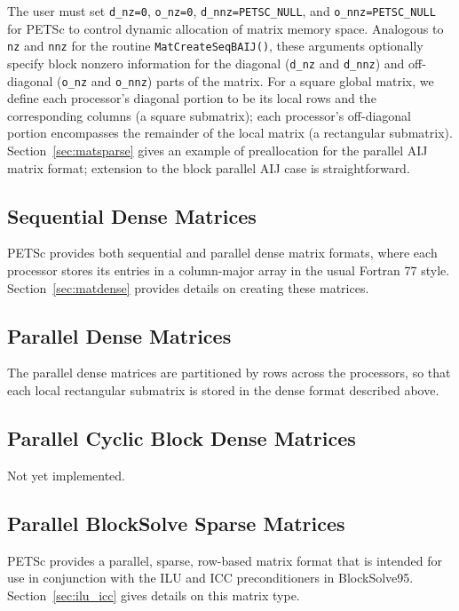 The user must set {\tt d\_nz=0}, {\tt o\_nz=0}, {\tt d\_nnz=PETSC\_NULL}, and 
{\tt o\_nnz=PETSC\_NULL} for PETSc to control dynamic allocation of matrix
memory space.  Analogous to {\tt nz} and {\tt nnz} for the routine 
{\tt MatCreateSeqBAIJ()}, these arguments optionally specify 
block nonzero information for the diagonal ({\tt d\_nz} and {\tt d\_nnz}) and 
off-diagonal ({\tt o\_nz} and {\tt o\_nnz}) parts of the matrix. 
For a square global matrix, we define each processor's diagonal portion 
to be its local rows and the corresponding columns (a square submatrix);  
each processor's off-diagonal portion encompasses the remainder of the
local matrix (a rectangular submatrix).  
Section~\ref{sec:matsparse} gives an example of preallocation for
the parallel AIJ matrix format; extension to the block parallel AIJ case
is straightforward.

\subsection{Sequential Dense Matrices}

PETSc provides both sequential and parallel dense matrix formats,
where each processor stores its entries in a column-major array in the
usual Fortran 77 style.  Section~\ref{sec:matdense} provides details
on creating these matrices.

\subsection{Parallel Dense Matrices}

The parallel dense matrices are partitioned by rows across the
processors, so that each local rectangular submatrix is stored in the
dense format described above.

\subsection{Parallel Cyclic Block Dense Matrices}
Not yet implemented.

\subsection{Parallel BlockSolve Sparse Matrices}

PETSc provides a parallel, sparse, row-based matrix format that is
intended for use in conjunction with the ILU and ICC preconditioners
in BlockSolve95.  Section~\ref{sec:ilu_icc} gives details on this
matrix type.

